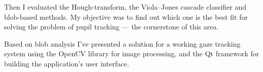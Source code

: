 Then I evaluated the Hough-transform, the Viola--Jones cascade classifier and blob-based methods. My objective was to find out which one is the best fit for solving the problem of pupil tracking --- the cornerstone of this area.

Based on blob analysis I've presented a solution for a working gaze tracking system using the OpenCV library for image processing, and the Qt framework for building the application's user interface. 

\vfill
